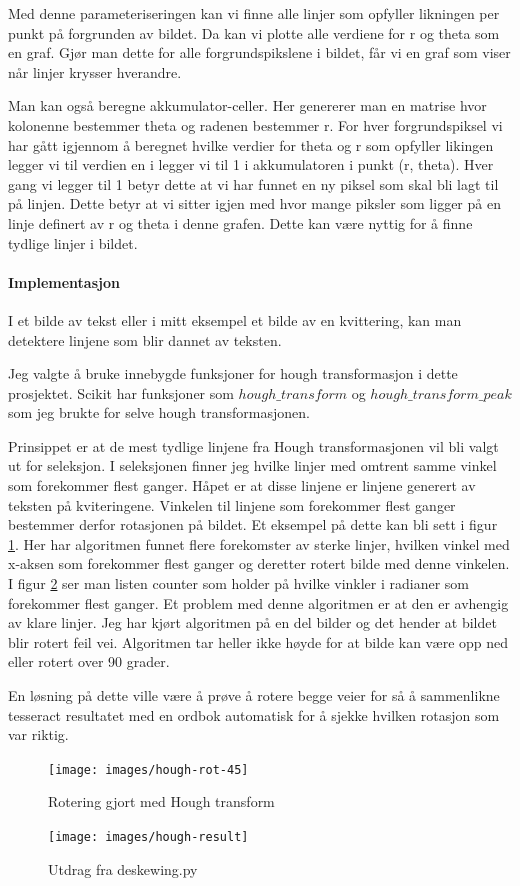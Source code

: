 \documentclass{article}
\begin{document}
Med denne parameteriseringen kan vi finne alle linjer som opfyller likningen per punkt på forgrunden av bildet. Da kan vi plotte alle verdiene for r og theta som en graf. Gjør man dette for alle forgrundspikslene i bildet, får vi en graf som viser når linjer krysser hverandre.

Man kan også beregne akkumulator-celler. Her genererer man en matrise hvor kolonenne bestemmer theta og radenen bestemmer r. For hver forgrundspiksel vi har gått igjennom å beregnet hvilke verdier for theta og r som opfyller likingen legger vi til verdien en i legger vi til 1 i akkumulatoren i punkt (r, theta). Hver gang vi legger til 1 betyr dette at vi har funnet en ny piksel som skal bli lagt til på linjen. Dette betyr at vi sitter igjen med hvor mange piksler som ligger på en linje definert av r og theta i denne grafen. Dette kan være nyttig for å finne tydlige linjer i bildet.

\paragraph{Implementasjon}
I et bilde av tekst eller i mitt eksempel et bilde av en kvittering, kan man detektere linjene som blir dannet av teksten.

Jeg valgte å bruke innebygde funksjoner for hough transformasjon i dette prosjektet. Scikit har funksjoner som $hough\_transform$ og $hough\_transform\_peak$ som jeg brukte for selve hough transformasjonen.

Prinsippet er at de mest tydlige linjene fra Hough transformasjonen vil bli valgt ut for seleksjon. I seleksjonen finner jeg hvilke linjer med omtrent samme vinkel som forekommer flest ganger. Håpet er at disse linjene er linjene generert av teksten på kviteringene. Vinkelen til linjene som forekommer flest ganger bestemmer derfor rotasjonen på bildet. Et eksempel på dette kan bli sett i figur \ref{fig:hough-45}. Her har algoritmen funnet flere forekomster av sterke linjer, hvilken vinkel med x-aksen som forekommer flest ganger og deretter rotert bilde med denne vinkelen. I figur \ref{fig:hough-result} ser man listen counter som holder på hvilke vinkler i radianer som forekommer flest ganger. Et problem med denne algoritmen er at den er avhengig av klare linjer. Jeg har kjørt algoritmen på en del bilder og det hender at bildet blir rotert feil vei. Algoritmen tar heller ikke høyde for at bilde kan være opp ned eller rotert over 90 grader.

En løsning på dette ville være å prøve å rotere begge veier for så å sammenlikne tesseract resultatet med en ordbok automatisk for å sjekke hvilken rotasjon som var riktig.



\begin{figure}[h]
\centering
\texttt{[image: images/hough-rot-45]}
\caption{Rotering gjort med Hough transform}
\label{fig:hough-45}
\end{figure}


\begin{figure}[h]
\centering
\texttt{[image: images/hough-result]}
\caption{Utdrag fra deskewing.py}
\label{fig:hough-result}
\end{figure}
\end{document}
